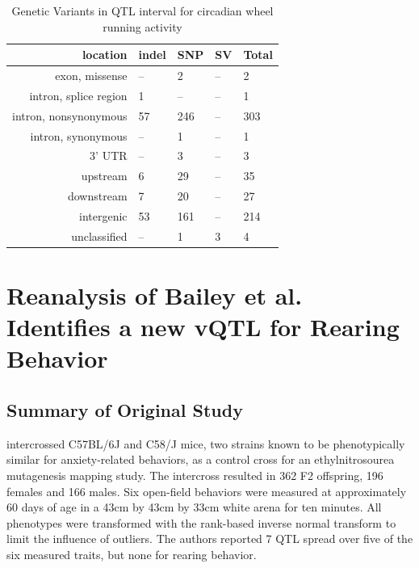     \begin{table}
        \begin{tabular}{rllll}
            \hline  
            \textbf{location}       & \textbf{indel}     & \textbf{SNP}   & \textbf{SV}    & \textbf{Total} \\
            \hline      
            exon, missense          & --        & 2     & --    & 2     \\
            intron, splice region   & 1         & --    & --    & 1     \\
            intron, nonsynonymous   & 57        & 246   & --    & 303   \\
            intron, synonymous      & --        & 1     & --    & 1     \\
            3' UTR                  & --        & 3     & --    & 3     \\
            upstream                & 6         & 29    & --    & 35    \\
            downstream              & 7         & 20    & --    & 27    \\
            intergenic              & 53        & 161   & --    & 214   \\
            unclassified            & --        & 1     & 3     & 4     \\
            \hline
        \end{tabular}
        \caption{Genetic Variants in QTL interval for circadian wheel running activity}
        \label{tab:kumar_variants}
    \end{table}


\section{Reanalysis of Bailey et al. Identifies a new vQTL for Rearing Behavior}

    \subsection{Summary of Original Study}
    \citet{Bailey2008} intercrossed C57BL/6J and C58/J mice, two strains known to be phenotypically similar for anxiety-related behaviors, as a control cross for an ethylnitrosourea mutagenesis mapping study.
    The intercross resulted in 362 F2 offspring, 196 females and 166 males.
    Six open-field behaviors were measured at approximately 60 days of age in a 43cm by 43cm by 33cm white arena for ten minutes.
    All phenotypes were transformed with the rank-based inverse normal transform to limit the influence of outliers.
    The authors reported 7 QTL spread over five of the six measured traits, but none for rearing behavior.


